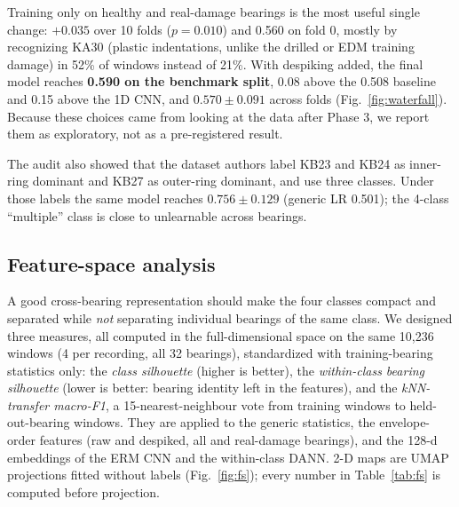 \documentclass[conference]{IEEEtran}
\newcommand{\mF}{macro-F1}
\begin{document}
Training only on healthy and real-damage bearings is the most useful single change: $+0.035$ over
10 folds ($p=0.010$) and 0.560 on fold 0, mostly by recognizing KA30 (plastic indentations, unlike
the drilled or EDM training damage) in 52\% of windows instead of 21\%. With despiking added, the
final model reaches \textbf{0.590 on the benchmark split}, 0.08 above the 0.508 baseline and 0.15
above the 1D CNN, and $0.570\pm0.091$ across folds (Fig.~\ref{fig:waterfall}). Because these choices came from looking at
the data after Phase 3, we report them as exploratory, not as a pre-registered result.

The audit also showed that the dataset authors \cite{lessmeier2016} label KB23 and KB24 as
inner-ring dominant and KB27 as outer-ring dominant, and use three classes. Under those labels
the same model reaches $0.756\pm0.129$ (generic LR 0.501); the 4-class ``multiple'' class is
close to unlearnable across bearings.




\subsection{Feature-space analysis}\label{sec:fs}
A good cross-bearing representation should make the four classes compact and separated while
\emph{not} separating individual bearings of the same class. We designed three measures, all
computed in the full-dimensional space on the same 10{,}236 windows (4 per recording, all 32
bearings), standardized with training-bearing statistics only: the \emph{class silhouette}
(higher is better), the \emph{within-class bearing silhouette} (lower is better: bearing identity
left in the features), and the \emph{kNN-transfer \mF{}}, a 15-nearest-neighbour vote from
training windows to held-out-bearing windows. They are applied to the generic statistics, the
envelope-order features (raw and despiked, all and real-damage bearings), and the 128-d
embeddings of the ERM CNN and the within-class DANN. 2-D maps are UMAP projections fitted
without labels (Fig.~\ref{fig:fs}); every number in Table~\ref{tab:fs} is computed before
projection.
\end{document}
